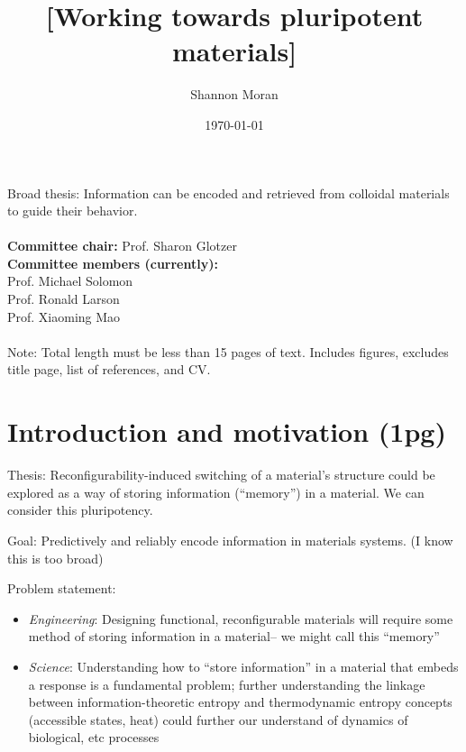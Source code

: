 \documentclass[11pt, oneside]{article}   	%
\title{[Working towards pluripotent materials]}
\author{Shannon Moran}
\date{\today}
\begin{document}
\maketitle
\thispagestyle{empty}
\noindent
Broad thesis: Information can be encoded and retrieved from colloidal materials to guide their behavior.
\\ \\
\textbf{Committee chair:} Prof. Sharon Glotzer \\ \textbf{Committee members (currently):} \\ Prof. Michael Solomon \\ Prof. Ronald Larson \\ Prof. Xiaoming Mao
\\ \\
Note: Total length must be less than 15 pages of text. Includes figures, excludes title page, list of references, and CV.



\newpage


\section{Introduction and motivation (1pg)}


Thesis: Reconfigurability-induced switching of a material's structure could be explored as a way of storing information (``memory'') in a material. We can consider this pluripotency.

Goal: Predictively and reliably encode information in materials systems. (I know this is too broad)

Problem statement:
\begin{itemize}
\item \textit{Engineering}: Designing functional, reconfigurable materials will require some method of storing information in a material-- we might call this ``memory''
\item \textit{Science}: Understanding how to ``store information'' in a material that embeds a response is a fundamental problem; further understanding the linkage between information-theoretic entropy and thermodynamic entropy concepts (accessible states, heat) could further our understand of dynamics of biological, etc processes
\end{itemize}
\end{document}
